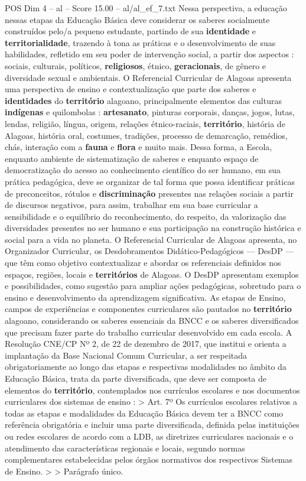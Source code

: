 \begin{textsample}{POS Dim 4 – al – Score 15.00 – al/al\_ef\_7.txt}
Nessa perspectiva, a educação nessas etapas da Educação Básica deve considerar os saberes socialmente construídos pelo/a pequeno estudante, partindo de sua \textbf{identidade} e \textbf{territorialidade}, trazendo à tona as práticas e o desenvolvimento de suas habilidades, refletido em seu poder de intervenção social, a partir dos aspectos : sociais, culturais, políticos, \textbf{religiosos}, étnico, \textbf{geracionais}, de gênero e diversidade sexual e ambientais.
O Referencial Curricular de Alagoas apresenta uma perspectiva de ensino e contextualização que parte dos saberes e \textbf{identidades} do \textbf{território} alagoano, principalmente elementos das culturas \textbf{indígenas} e quilombolas : \textbf{artesanato}, pinturas corporais, danças, jogos, lutas, lendas, religião, língua, origem, relações étnico-raciais, \textbf{território}, história de Alagoas, história oral, costumes, tradições, processo de demarcação, remédios, chás, interação com a \textbf{fauna} e \textbf{flora} e muito mais.
Dessa forma, a Escola, enquanto ambiente de sistematização de saberes e enquanto espaço de democratização do acesso ao conhecimento científico do ser humano, em sua prática pedagógica, deve se organizar de tal forma que possa identificar práticas de preconceitos, rótulos e \textbf{discriminação} presentes nas relações sociais a partir de discursos negativos, para assim, trabalhar em sua base curricular a sensibilidade e o equilíbrio do reconhecimento, do respeito, da valorização das diversidades presentes no ser humano e sua participação na construção histórica e social para a vida no planeta.
O Referencial Curricular de Alagoas apresenta, no Organizador Curricular, os Desdobramentos Didático-Pedagógicos — DesDP — que têm como objetivo contextualizar e abordar os referenciais definidos nos espaços, regiões, locais e \textbf{territórios} de Alagoas.
O DesDP apresentam exemplos e possibilidades, como sugestão para ampliar ações pedagógicas, sobretudo para o ensino e desenvolvimento da aprendizagem significativa.
As etapas de Ensino, campos de experiências e componentes curriculares são pautados no \textbf{território} alagoano, considerando os saberes essenciais da BNCC e os saberes diversificados que precisam fazer parte do trabalho curricular desenvolvido em cada escola.
A Resolução CNE/CP Nº 2, de 22 de dezembro de 2017, que institui e orienta a implantação da Base Nacional Comum Curricular, a ser respeitada obrigatoriamente ao longo das etapas e respectivas modalidades no âmbito da Educação Básica, trata da parte diversificada, que deve ser composta de elementos do \textbf{território}, contemplados nos currículos escolares e nos documentos curriculares dos sistemas de ensino : > Art. 7º Os currículos escolares relativos a todas as etapas e modalidades da Educação Básica devem ter a BNCC como referência obrigatória e incluir uma parte diversificada, definida pelas instituições ou redes escolares de acordo com a LDB, as diretrizes curriculares nacionais e o atendimento das características regionais e locais, segundo normas complementares estabelecidas pelos órgãos normativos dos respectivos Sistemas de Ensino. > > Parágrafo único.

\end{textsample}
